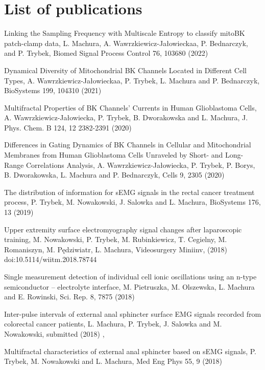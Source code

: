 \section{List of publications}
  \begin{etaremune}  %
  \item Linking the Sampling Frequency with Multiscale Entropy to classify mitoBK patch-clamp data, L. Machura, A. Wawrzkiewicz-Jałowieckaa, P. Bednarczyk, and P. Trybek, Biomed Signal Process Control 76,  103680 (2022)

\item Dynamical Diversity of Mitochondrial BK Channels Located in Different Cell Types, A. Wawrzkiewicz-Jałowieckaa, P. Trybek, L. Machura and P. Bednarczyk, BioSystems 199,  104310 (2021) 

\item Multifractal Properties of BK Channels’ Currents in Human Glioblastoma Cells, A. Wawrzkiewicz-Jałowiecka, P. Trybek, B. Dworakowska and L. Machura, J. Phys. Chem. B 124,  12  2382-2391  (2020)

\item Differences in Gating Dynamics of BK Channels in Cellular and Mitochondrial Membranes from Human Glioblastoma Cells Unraveled by Short- and Long-Range Correlations Analysis, A. Wawrzkiewicz-Jałowiecka, P. Trybek, P. Borys, B. Dworakowska, L. Machura and P. Bednarczyk, Cells 9,  2305 (2020)

\item The distribution of information for sEMG signals in the rectal cancer treatment process, P. Trybek, M. Nowakowski, J. Salowka and L. Machura, BioSystems 176,  13 (2019)

\item Upper extremity surface electromyography signal changes after laparoscopic training, M. Nowakowski, P. Trybek, M. Rubinkiewicz, T. Cegielny, M. Romaniszyn, M. Pędziwiatr, L. Machura, Videosurgery Miniinv,  (2018)  doi:10.5114/wiitm.2018.78744

\item Single measurement detection of individual cell ionic oscillations using an n-type semiconductor – electrolyte interface, M. Pietruszka, M. Olszewska, L. Machura and E. Rowinski, Sci. Rep. 8,  7875 (2018)

\item Inter-pulse intervals of external anal sphincter surface EMG signals recorded from colorectal cancer patients, L. Machura, P. Trybek, J. Salowka and M. Nowakowski, submitted (2018)
, 
\item Multifractal characteristics of external anal sphincter based on sEMG signals, P. Trybek, M. Nowakowski and L. Machura, Med Eng Phys 55,  9 (2018)


\end{etaremune}
